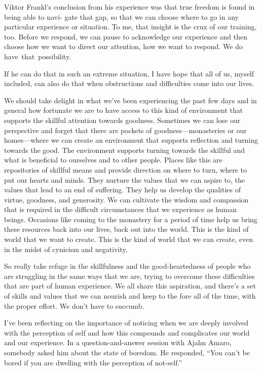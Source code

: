 Viktor Frankl's conclusion from his experience was that true freedom is found in being able to navi- \linebreak gate that gap, so that we can choose where to go in any particular experience or situation. To me, that insight is the crux of our training, too. Before we respond, we can pause to acknowledge our experience and then \linebreak choose how we want to direct our attention, how we want to respond. We do \mbox{have that possibility.}

If he can do that in such an extreme situation, I have hope that all of us, myself included, can also do that when obstructions and difficulties come into our lives.

{\parfillskip=0pt
We should take delight in what we've been experiencing the past few days and in general how fortunate we are to have access to this kind of environment that supports the skillful attention towards goodness. Sometimes we can lose our perspective and forget that there are pockets of goodness---monasteries or our homes---where we can create an environment that supports reflection and turning towards the good. The environment supports turning towards the skillful and what is beneficial to ourselves and to other people. Places like this are repositories of skillful means and provide direction on where to turn, where to put our hearts and minds. They nurture the values that we can aspire to, the values that lead to an end of suffering. They help us develop the qualities of virtue, goodness, and generosity. We can cultivate the wisdom and compassion that is required in the difficult circumstances that we experience as human beings. Occasions like coming to the monastery for a period of time help us bring these resources back into our lives, back out into the world. This is the kind of world that we want to create. This is the kind of world that we can create, even in the midst of cynicism and negativity.
\par}

So really take refuge in the skillfulness and the good-heartedness of people who are struggling in the same ways that we are, trying to overcome these difficulties that are part of human experience. We all share this aspiration, and there's a set of skills and values that we can nourish and keep to the fore all of the time, with the proper effort. We don't have to succumb.

I've been reflecting on the importance of noticing when we are deeply involved with the perception of \linebreak self and how this compounds and complicates our world and our experience. In a question-and-answer session with Ajahn Amaro, somebody asked him about the state of boredom. He responded, ``You can't be bored if you are dwelling with the perception of not-self.''

